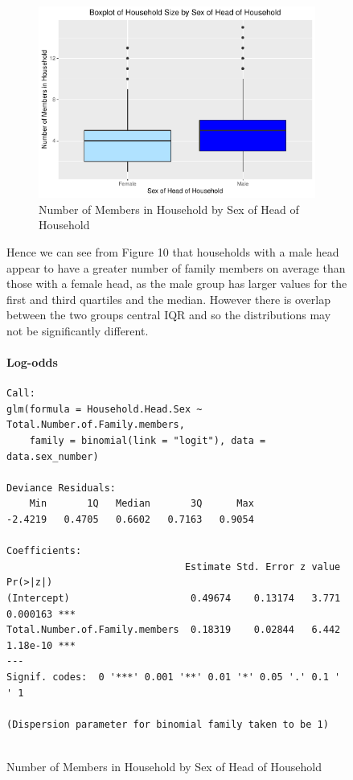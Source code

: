 \documentclass[
]{article}
\begin{document}
\begin{figure}[H]
\begin{figure}[H]
{\centering \includegraphics[width=0.8\linewidth]{Group_01_Project2_demo_files/figure-latex/boxplot of sex and members-1} 

}

\caption{Number of Members in Household by Sex of Head of Household}\label{fig:boxplot of sex and members}
\end{figure}

Hence we can see from Figure 10 that households with a male head appear
to have a greater number of family members on average than those with a
female head, as the male group has larger values for the first and third
quartiles and the median. However there is overlap between the two
groups central IQR and so the distributions may not be significantly
different.

\hypertarget{log-odds}{%
\paragraph{Log-odds}\label{log-odds}}

\begin{verbatim}
Call:
glm(formula = Household.Head.Sex ~ Total.Number.of.Family.members, 
    family = binomial(link = "logit"), data = data.sex_number)

Deviance Residuals: 
    Min       1Q   Median       3Q      Max  
-2.4219   0.4705   0.6602   0.7163   0.9054  

Coefficients:
                               Estimate Std. Error z value Pr(>|z|)    
(Intercept)                     0.49674    0.13174   3.771 0.000163 ***
Total.Number.of.Family.members  0.18319    0.02844   6.442 1.18e-10 ***
---
Signif. codes:  0 '***' 0.001 '**' 0.01 '*' 0.05 '.' 0.1 ' ' 1

(Dispersion parameter for binomial family taken to be 1)


\end{verbatim}
\end{figure}
\end{document}
